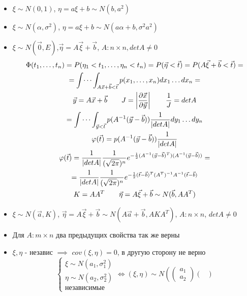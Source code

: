 \documentclass{article}
\begin{document}
\begin{itemize}
  \item $\xi\sim N(0,1)$, $\eta=a\xi+b \sim N(b,a^2)$
  \item $\xi\sim N(\alpha, \sigma^2)$, $\eta=a\xi+b\sim N(a\alpha+b, \sigma^2a^2)$
  \item $\xi\sim N(\vec{0},E)$,$\vec{\eta}=A\vec{\xi}+\vec{b}$, $A:n\times n,detA\neq 0$ \\ 
    \begin{gather*}
      \Phi(t_1,\dots,t_n)=P(\eta_1<t_1,\dots,\eta_n<t_n)=P(\vec{\eta}<\vec{t})=P(A\vec{\xi}+\vec{b}<\vec{t})= \\
    = \int\dots\int_{A\vec{x}+\vec{b}<\vec{t}}p(x_1,\dots,x_n)dx_1\dots dx_n= \\
      \vec{y}=A\vec{x}+\vec{b} \qquad J=\left|\frac{\partial \vec{x}}{\partial \vec{y}}\right| \qquad \frac{1}{J}=detA \\
    =\idotsint_{\vec{y}<\vec{t}}p(A^{-1}(\vec{y}-\vec{b}))\frac{1}{|detA|}dy_1\dots dy_n \\
    \phi(\vec{t})=p(A^{-1}(\vec{y}-\vec{b}))\frac{1}{|detA|} \\
    \phi(\vec{t})=\frac{1}{|detA|}\frac{1}{(\sqrt{2\pi})^n}e^{-\frac{1}{2}(A^{-1}(\vec{y}-\vec{b})^T) (A^{-1}(\vec{y}-\vec{b}))}= \\
  =\frac{1}{|detA|}\frac{1}{(\sqrt{2\pi})^n}e^{-\frac{1}{2}(\vec{t}-\vec{b})^T (A^T)^{-1} A^{-1}(\vec{t}-\vec{b})} \\
  K=AA^T \qquad \vec{\eta}=A\vec{\xi}+\vec{b}\sim N(\vec{b}, AA^T) \\
    \end{gather*}
\item $\xi\sim N(\vec{a},K)$, $\vec{\eta}=A\vec{\xi}+\vec{b}\sim N(A\vec{a}+\vec{b},AKA^{T})$, $A:n\times n$, $detA\neq 0$
\item Для $A:m\times n$ два предыдущих свойства так же верны
\item $\xi,\eta$ - независ $\implies$ $cov(\xi,\eta)=0$, в другую сторону не верно
\[
  \left\{\begin{aligned}
    \xi \sim N(a_1, \sigma_1^2) \\ 
    \eta \sim N(a_2, \sigma_2^2) \\ 
    \text{независимые}
  \end{aligned}\right.
  \Leftrightarrow
  (\xi,\eta)\sim N\left(\begin{pmatrix}
    a_1 \\ a_2
  \end{pmatrix}\begin{pmatrix}

\end{pmatrix}\]
\end{itemize}
\end{document}
